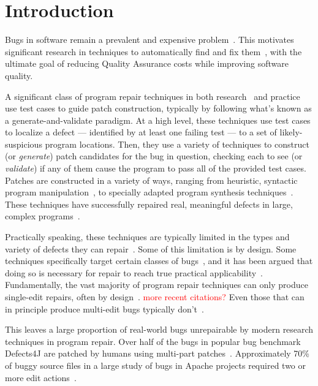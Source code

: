 \documentclass[sigconf, timestamp-false, anonymous=true]{acmart}
\newcommand\todo[1]{\textcolor{red}{#1}}
\begin{document}

\maketitle

\section{Introduction}

Bugs in software remain a prevalent and expensive problem~\cite{whatever}.  This
motivates significant research in techniques to automatically find and fix
them~\cite{whatever}, with the ultimate goal of reducing Quality Assurance costs
while improving software quality. 

A significant class of program repair techniques in both
research~\cite{examples} and practice~\cite{tyfacebook} use test cases to guide
patch construction, typically by following what's known as a
generate-and-validate paradigm. At a high level, these techniques use test cases
to localize a defect --- identified by at least one failing test --- to a set of
likely-suspicious program locations. Then, they use a variety of techniques to
construct (or \emph{generate}) patch candidates for the bug in question,
checking each to see (or \emph{validate}) if any of them cause the program to
pass all of the provided test cases.  
%
Patches are constructed in a variety of ways, ranging from heuristic, syntactic
program manipulation~\cite{syntax,examples}, to specially adapted program
synthesis techniques~\cite{examples}. These techniques have successfully
repaired real, meaningful defects in large, complex programs~\cite{examples}.

Practically speaking, these techniques are typically limited in the types and
variety of defects they can repair~\cite{for,example}. Some of this limitation
is by design. Some techniques specifically target certain classes of
bugs~\cite{nopol,sapfix}, and it has been argued that doing so is necessary for
repair to reach true practical applicability~\cite{maybe}. Fundamentally, the
vast majority of program repair techniques can only produce single-edit repairs,
often by design~\cite{rsrepair, ae, hdrepair}. \todo{more recent citations?}
Even those that can in principle produce multi-edit bugs typically
don't~\cite{poor,genprog}.

This leaves a large proportion of real-world bugs unrepairable by modern
research techniques in program repair.  Over half of the bugs in popular bug
benchmark Defects4J are patched by humans using multi-part
patches~\cite{d4j-dissection}. Approximately 70\% of buggy source files in a
large study of bugs in Apache projects required two or more edit
actions~\cite{zhong2015}.
\end{document}
